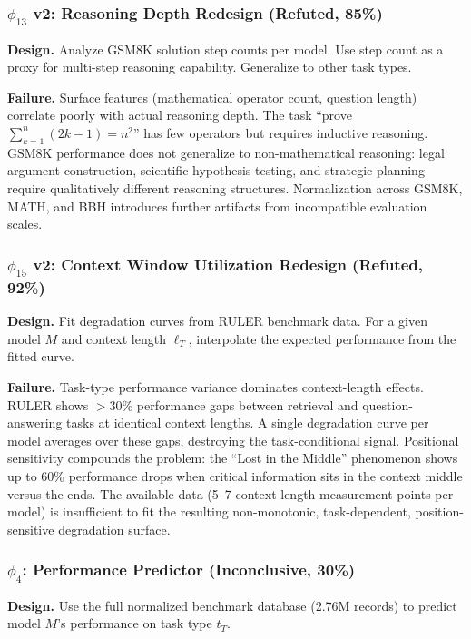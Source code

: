 \subsubsection{$\phi_{13}$ v2: Reasoning Depth Redesign (Refuted, 85\%)}

\textbf{Design.} Analyze GSM8K solution step counts per model. Use step count as a proxy for multi-step reasoning capability. Generalize to other task types.

\textbf{Failure.} Surface features (mathematical operator count, question length) correlate poorly with actual reasoning depth. The task ``prove $\sum_{k=1}^n (2k-1) = n^2$'' has few operators but requires inductive reasoning. GSM8K performance does not generalize to non-mathematical reasoning: legal argument construction, scientific hypothesis testing, and strategic planning require qualitatively different reasoning structures. Normalization across GSM8K, MATH, and BBH introduces further artifacts from incompatible evaluation scales.

\subsubsection{$\phi_{15}$ v2: Context Window Utilization Redesign (Refuted, 92\%)}

\textbf{Design.} Fit degradation curves from RULER benchmark data. For a given model $M$ and context length $\ell_T$, interpolate the expected performance from the fitted curve.

\textbf{Failure.} Task-type performance variance dominates context-length effects. RULER shows $>$30\% performance gaps between retrieval and question-answering tasks at identical context lengths. A single degradation curve per model averages over these gaps, destroying the task-conditional signal. Positional sensitivity compounds the problem: the ``Lost in the Middle'' phenomenon \citep{liu2023lost} shows up to 60\% performance drops when critical information sits in the context middle versus the ends. The available data (5--7 context length measurement points per model) is insufficient to fit the resulting non-monotonic, task-dependent, position-sensitive degradation surface.

\subsubsection{$\phi_4$: Performance Predictor (Inconclusive, 30\%)}

\textbf{Design.} Use the full normalized benchmark database (2.76M records) to predict model $M$'s performance on task type $t_T$.

